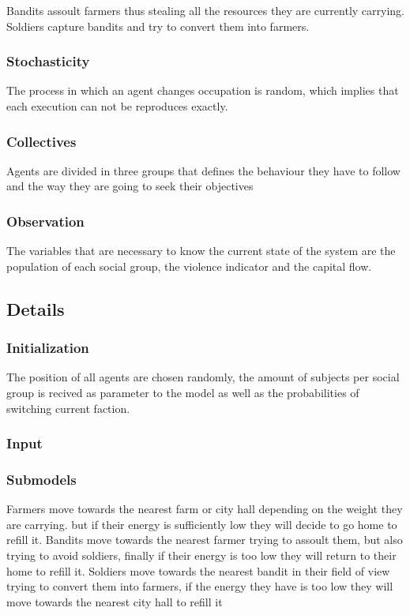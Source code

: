 \documentclass{wscpaperproc}
\theoremstyle{wsc}
\begin{document}
Bandits assoult farmers thus stealing all the resources they are currently
carrying. Soldiers capture bandits and try to convert them into farmers.

\subsubsection{Stochasticity}

The process in which an agent changes occupation is random, which implies that
each execution can not be reproduces exactly.

\subsubsection{Collectives}

Agents are divided in three groups that defines the behaviour they have to
follow and the way they are going to seek their objectives

\subsubsection{Observation}

The variables that are necessary to know the current state of the system are
the population of each social group, the violence indicator and the capital
flow.

\subsection{Details}

\subsubsection{Initialization}

The position of all agents are chosen randomly, the amount of subjects per
social group is recived as parameter to the model as well as the probabilities
of switching current faction.

\subsubsection{Input}

\subsubsection{Submodels}

Farmers move towards the nearest farm or city hall depending on the weight they
are carrying. but if their energy is sufficiently low they will decide to go
home to refill it. Bandits move towards the nearest farmer trying to assoult
them, but also trying to avoid soldiers, finally if their energy is too low
they will return to their home to refill it. Soldiers move towards the nearest
bandit in their field of view trying to convert them into farmers, if the
energy they have is too low they will move towards the nearest city hall to
refill it



\end{document}
